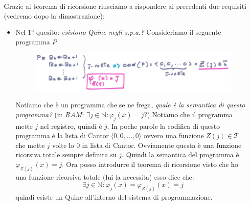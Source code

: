 \documentclass{article}
\begin{document}
Grazie al teorema di ricorsione riusciamo a rispondere ai precedenti due requisiti (vedremo
dopo la dimostrazione):
\begin{itemize}
    \item Nel 1° quesito: \textit{esistono Quine negli s.p.a.?} Consideriamo il seguente
          programma $P$
          \begin{figure}[H]
              \centering
              \includegraphics[scale=0.5]{images/P_teoremaric.png}
          \end{figure}
          Notiamo che è un programma che se ne frega, \textit{quale è la semantica di questo
              programma?} (in $RAM$: $\exists j\in\mathbb{N}:\varphi_j(x)=j?$) Notiamo che il programma mette $j$ nel registro, quindi è $j$.
          In poche parole la codifica di questo programma è la lista di Cantor $\langle0,0,\dots, 0\rangle$
          ovvero una funzione $Z(j)\in\mathcal{T}$ che mette $j$ volte lo 0 in lista di Cantor. Ovviamente
          questa è una funzione ricorsiva totale sempre definita su $j$.
          Quindi la semantica del programma è $\varphi_{Z(j)}(x)=j$.
          Ora posso introdurre il teorema di ricorsione visto che ho una funzione ricorsiva totale (lui
          la necessita) esso dice che:
          $$\exists j\in\mathbb{N}:\varphi_j(x)=\varphi_{Z(j)}(x)=j$$
          quindi esiste un Quine all'interno del sistema di programmazione.


\end{itemize}
\end{document}
